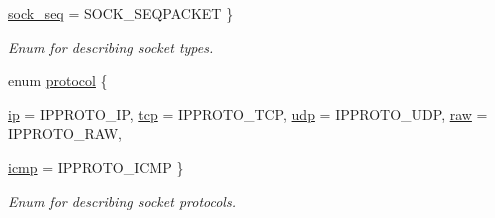 \begin{CompactItemize}
\par
\hyperlink{classusock_1_1BaseSocket_8117d25c7b482eb594d68137868ce5f9adfa1bc59768fc0be580b4ba95c6f357}{sock\_\-seq} =  SOCK\_\-SEQPACKET
 \}
\begin{CompactList}\small\item\em Enum for describing socket types. \item\end{CompactList}\item 
enum \hyperlink{classusock_1_1BaseSocket_09208675b41c416fb402824742963eaa}{protocol} \{ \par
\hyperlink{classusock_1_1BaseSocket_09208675b41c416fb402824742963eaabf22c7bfd50adb88e468d3744e932497}{ip} =  IPPROTO\_\-IP, 
\hyperlink{classusock_1_1BaseSocket_09208675b41c416fb402824742963eaa3a17ad9b4036c0957dc098c76e8fba2a}{tcp} =  IPPROTO\_\-TCP, 
\hyperlink{classusock_1_1BaseSocket_09208675b41c416fb402824742963eaae0719b1eee901237a5ec0ba9031cdfce}{udp} =  IPPROTO\_\-UDP, 
\hyperlink{classusock_1_1BaseSocket_09208675b41c416fb402824742963eaa0d09509fb52df026fec01b98795f9ac4}{raw} =  IPPROTO\_\-RAW, 
\par
\hyperlink{classusock_1_1BaseSocket_09208675b41c416fb402824742963eaa5c569c4f7525d07ee96857a015d057bb}{icmp} =  IPPROTO\_\-ICMP
 \}
\begin{CompactList}\small\item\em Enum for describing socket protocols. \item\end{CompactList}\end{CompactItemize}
